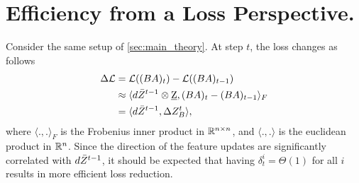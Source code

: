 \section{Efficiency from a Loss Perspective.}
Consider the same setup of \cref{sec:main_theory}. At step $t$, the loss changes as follows
\begin{align*}
\Delta \mathcal{L} &= \mathcal{L}((BA)_t) - \mathcal{L}((BA)_{t-1}) \\
&\approx \langle d \Bar{Z}^{t-1} \otimes \underbar{Z}, (BA)_t - (BA)_{t-1} \rangle_F \\
&= \langle d\Bar{Z}^{t-1}, \Delta Z_B^t \rangle,
\end{align*}    
where $\langle.,.\rangle_F$ is the Frobenius inner product in $\mathbb{R}^{n\times n}$, and $\langle.,.\rangle$ is the euclidean product in $\mathbb{R}^n$. Since the direction of the feature updates are significantly correlated with $d \Bar{Z}^{t-1}$, it should be expected that having $\delta_t^i = \Theta(1)$ for all $i$ results in more efficient loss reduction.